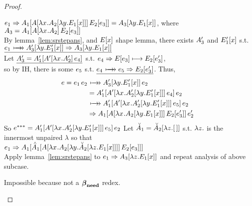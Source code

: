 \documentclass{article}
\begin{document}
\begin{proof}
\begin{byCases}
\begin{byCases}
\begin{byCases}
\begin{byCases}
    $\e_1 \pstep 
    \inA[_1]{{\ap{\inA{\lx\inA[_2]{\ly\inE[_1]{x}}}}{\inE[_2]{\e_3}}}} = 
    \inA[_3]{\ly\inE[_1]{x}}$, 
    where $\A_3 = \inA[_1]{{\ap{\inA{\lx\A_2}}{\inE[_2]{\e_3}}}}$\\
    By lemma~\ref{lem:srstepans}, and $\Ex$ shape lemma, there exists 
    $\A_3'$ and $\Ex[_1']$ s.t. \\
    $\underline{\e_1 \srsteps \inA[_3']{\ly\Ex[_1']} 
                     \pstep \inA[_3]{\ly\Ex[_1]}}$ \\
    Let $\underline{ \A_3' = \inA[_1']{{\ap{\inA[']{\lx\A_2'}}{\e_4}}} }$ s.t. 
    $\e_4 \pstep \inE{\e_3} \srstep \inE[_2]{\e_3'}$,\\
    so by IH, there is some $\e_5$ s.t. 
    $\underline{ \e_4 \srsteps \e_5 \pstep\inE[_2]{\e_3'} }$. Thus,
    \begin{align*}
    \e = \ap{\e_1}{\e_2} &\srsteps \ap{\inA[_3']{\ly\Ex[_1']}}{\e_2}\\
 &=\ap{\inA[_1']{{\ap{\inA[']{\lx\inA[_2']{\ly\Ex[_1']}}}{\e_4}}}}{\e_2}\\
 &\srsteps\ap{\inA[_1']{{\ap{\inA[']{\lx\inA[_2']{\ly\Ex[_1']}}}{\e_5}}}}{\e_2}\\
 &\pstep 
 \ap{\inA[_1]{{\ap{\inA{\lx\inA[_2]{\ly\inE[_1]{x}}}}{\inE[_2]{\e_3'}}}}}{\e_2'}
  \end{align*}
    So $\ethree = 
       \ap{\inA[_1']{{\ap{\inA[']{\lx\inA[_2']{\ly\Ex[_1']}}}{\e_5}}}}{\e_2}$
    Let $\Am_1 = \inAm[_2]{\lz\hole}$ s.t. $\lz$ is the innermost unpaired 
    $\lambda$ so that \\
    $\e_1 \pstep 
    \inA[_1]{\inAp[_1]{{\ap{\inA{\lx\inA[_2]{\ly\inAm[_2]{\lz\inE[_1]{x}}}}}
          {\inE[_2]{\e_3}}}}}$\\
    Apply lemma~\ref{lem:srstepans} to $\e_1 \pstep \inA[_3]{\lz\Ex[_1]}$ and
    repeat analysis of above subcase.
    \end{byCases}
    \end{byCases}
  \end{byCases}
  Impossible because not a $\betaneednr$ redex.
\end{byCases}
\end{proof}
\end{document}
